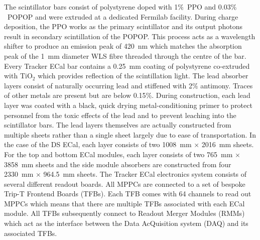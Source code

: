 \newline
\newline
The scintillator bars consist of polystyrene doped with 1$\%$~PPO and 0.03$\%$~POPOP and were extruded at a dedicated Fermilab facility.  During charge deposition, the PPO works as the primary scintillator and its output photons result in secondary scintillation of the POPOP.  This process acts as a wavelength shifter to produce an emission peak of 420~nm which matches the absorption peak of the 1~mm diameter WLS fibre threaded through the centre of the bar.  Every Tracker ECal bar contains a 0.25~mm coating of polystyrene co-extruded with TiO$_2$ which provides reflection of the scintillation light.
\newline
\newline
The lead absorber layers consist of naturally occurring lead and stiffened with 2$\%$ antimony.  Traces of other metals are present but are below 0.15$\%$.  During construction, each lead layer was coated with a black, quick drying metal-conditioning primer to protect personnel from the toxic effects of the lead and to prevent leaching into the scintillator bars.  The lead layers themselves are actually constructed from multiple sheets rather than a single sheet largely due to ease of transportation.  In the case of the DS ECal, each layer consists of two 1008~mm $\times$ 2016~mm sheets.  For the top and bottom ECal modules, each layer consists of two 765~mm $\times$ 3858~mm sheets and the side module absorbers are constructed from four 2330~mm $\times$ 964.5~mm sheets.
\newline
\newline
The Tracker ECal electronics system consists of several different readout boards.  All MPPCs are connected to a set of bespoke Trip-T\cite{Estrada:2003fh} Frontend Boards (TFBs).  Each TFB comes with 64 channels to read out MPPCs which means that there are multiple TFBs associated with each ECal module.  All TFBs subsequently connect to Readout Merger Modules (RMMs) which act as the interface between the Data AcQuisition system (DAQ) and its associated TFBs.

